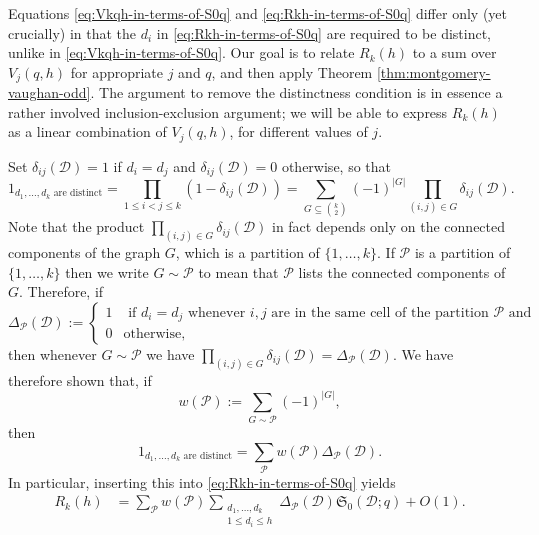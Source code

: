 \documentclass[11pt,letterpaper]{amsart}
\newcommand{\abs}[1]{\left\lvert #1\right\rvert}
\theoremstyle{definition}
\begin{document}
Equations \eqref{eq:Vkqh-in-terms-of-S0q} and \eqref{eq:Rkh-in-terms-of-S0q} differ only (yet crucially) in that the $d_i$ in \eqref{eq:Rkh-in-terms-of-S0q} are required to be distinct, unlike in \eqref{eq:Vkqh-in-terms-of-S0q}. Our goal is to relate $R_k(h)$ to a sum over $V_j(q,h)$ for appropriate $j$ and $q$, and then apply Theorem \ref{thm:montgomery-vaughan-odd}. The argument to remove the distinctness condition is in essence a rather involved inclusion-exclusion argument; we will be able to express $R_k(h)$ as a linear combination of $V_j(q,h)$, for different values of $j$.

Set $\delta_{ij}(\mathcal{D}) = 1$ if $d_i = d_j$ and $\delta_{ij}(\mathcal{D}) = 0$ otherwise, so that
\begin{equation*}
1_{d_1,\ldots,d_k\textrm{ are distinct}}=\prod_{1 \le i < j \le k} (1-\delta_{ij}(\mathcal{D})) = \sum_{G\subseteq \binom{k}{2}}(-1)^{\abs{G}}\prod_{(i,j)\in G}\delta_{ij}(\mathcal{D}).
\end{equation*}
Note that the product $\prod_{(i,j)\in G}\delta_{ij}(\mathcal{D})$ in fact depends only on the connected components of the graph $G$, which is a partition of $\{1,\ldots,k\}$. If $\mathcal{P}$ is a partition of $\{1,\ldots,k\}$ then we write $G\sim \mathcal{P}$ to mean that $\mathcal{P}$ lists the connected components of $G$. Therefore, if
\begin{equation*}
\Delta_{\mathcal P}(\mathcal{D}) := \begin{cases} 1&\textrm{ if }d_i=d_j\textrm{ whenever }i,j\textrm{ are in the same cell of the partition }\mathcal{P}\textrm{ and }\\
0&\textrm{otherwise,}\end{cases}
\end{equation*}
then whenever $G\sim \mathcal{P}$ we have $\prod_{(i,j)\in G}\delta_{ij}(\mathcal{D})=\Delta_{\mathcal{P}}(\mathcal{D})$. We have therefore shown that, if 
\begin{equation*}
w(\mathcal P) := \sum_{G\sim \mathcal P} (-1)^{\abs{G}},
\end{equation*}
then 
\[1_{d_1,\ldots,d_k\textrm{ are distinct}}=\sum_{\mathcal{P}}w(\mathcal{P})\Delta_{\mathcal{P}}(\mathcal{D}).\]
In particular, inserting this into \eqref{eq:Rkh-in-terms-of-S0q} yields
\begin{align*}
R_k(h) &= \sum_{\mathcal P} w(\mathcal P) \sum_{\substack{d_1, \dots, d_k \\ 1 \le d_i \le h}}\Delta_{\mathcal{P}}(\mathcal D) \mathfrak S_0(\mathcal D;q)  + O(1).
\end{align*}
\end{document}

